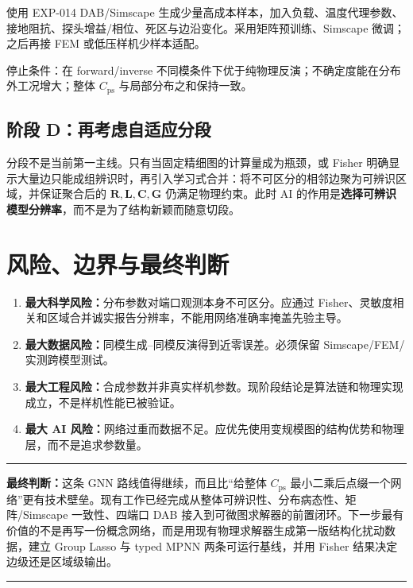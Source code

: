 \documentclass[UTF8,11pt,a4paper]{ctexart}
\newcommand{\Cps}{C_{\mathrm{ps}}}
\newcommand{\RR}{\bm R}
\newcommand{\LL}{\bm L}
\newcommand{\CC}{\bm C}
\newcommand{\GG}{\bm G}
\newenvironment{keybox}{\begin{center}\begin{minipage}{0.91\textwidth}\color{navy}\hrule\vspace{0.55em}\color{black}}{\vspace{0.55em}\color{navy}\hrule\color{black}\end{minipage}\end{center}}
\begin{document}
使用 EXP-014 DAB/Simscape 生成少量高成本样本，加入负载、温度代理参数、接地阻抗、探头增益/相位、死区与边沿变化。采用矩阵预训练、Simscape 微调；之后再接 FEM 或低压样机少样本适配。

停止条件：在 forward/inverse 不同模条件下优于纯物理反演；不确定度能在分布外工况增大；整体 $\Cps$ 与局部分布之和保持一致。

\subsection{阶段 D：再考虑自适应分段}

分段不是当前第一主线。只有当固定精细图的计算量成为瓶颈，或 Fisher 明确显示大量边只能成组辨识时，再引入学习式合并：将不可区分的相邻边聚为可辨识区域，并保证聚合后的 $\RR,\LL,\CC,\GG$ 仍满足物理约束。此时 AI 的作用是\textbf{选择可辨识模型分辨率}，而不是为了结构新颖而随意切段。

\section{风险、边界与最终判断}

\begin{enumerate}
\item \textbf{最大科学风险：}分布参数对端口观测本身不可区分。应通过 Fisher、灵敏度相关和区域合并诚实报告分辨率，不能用网络准确率掩盖先验主导。
\item \textbf{最大数据风险：}同模生成--同模反演得到近零误差。必须保留 Simscape/FEM/实测跨模型测试。
\item \textbf{最大工程风险：}合成参数并非真实样机参数。现阶段结论是算法链和物理实现成立，不是样机性能已被验证。
\item \textbf{最大 AI 风险：}网络过重而数据不足。应优先使用变规模图的结构优势和物理层，而不是追求参数量。
\end{enumerate}

\begin{keybox}
\textbf{最终判断：}这条 GNN 路线值得继续，而且比“给整体 $\Cps$ 最小二乘后点缀一个网络”更有技术壁垒。现有工作已经完成从整体可辨识性、分布病态性、矩阵/Simscape 一致性、四端口 DAB 接入到可微图求解器的前置闭环。下一步最有价值的不是再写一份概念网络，而是用现有物理求解器生成第一版结构化扰动数据，建立 Group Lasso 与 typed MPNN 两条可运行基线，并用 Fisher 结果决定边级还是区域级输出。
\end{keybox}

\clearpage
\end{document}
